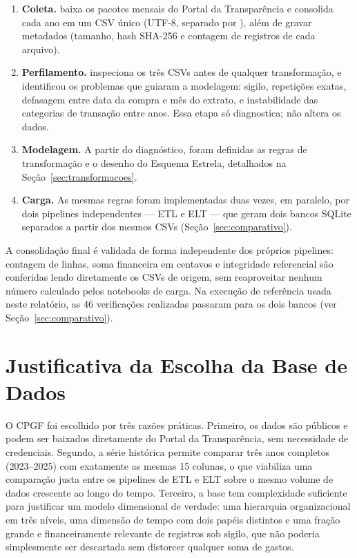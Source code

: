 \documentclass[12pt,a4paper]{article}
\newcommand{\code}[1]{\texttt{\detokenize{#1}}}
\begin{document}
\begin{enumerate}
    \item \textbf{Coleta.} \code{scripts/extract_cpgf.py} baixa os pacotes
    mensais do Portal da Transparência e consolida cada ano em um CSV único
    (UTF-8, separado por \code{;}), além de gravar metadados (tamanho, hash
    SHA-256 e contagem de registros de cada arquivo).
    \item \textbf{Perfilamento.} \code{scripts/profile_cpgf.py} inspeciona
    os três CSVs antes de qualquer transformação, e identificou os
    problemas que guiaram a modelagem: sigilo, repetições exatas,
    defasagem entre data da compra e mês do extrato, e instabilidade das
    categorias de transação entre anos. Essa etapa só diagnostica; não
    altera os dados.
    \item \textbf{Modelagem.} A partir do diagnóstico, foram definidas as
    regras de transformação e o desenho do Esquema Estrela, detalhados na
    Seção~\ref{sec:transformacoes}.
    \item \textbf{Carga.} As mesmas regras foram implementadas duas vezes,
    em paralelo, por dois pipelines independentes --- ETL e ELT --- que
    geram dois bancos SQLite separados a partir dos mesmos CSVs
    (Seção~\ref{sec:comparativo}).
\end{enumerate}

A consolidação final é validada de forma independente dos próprios
pipelines: contagem de linhas, soma financeira em centavos e integridade
referencial são conferidas lendo diretamente os CSVs de origem, sem
reaproveitar nenhum número calculado pelos notebooks de carga. Na execução
de referência usada neste relatório, as 46 verificações realizadas
passaram para os dois bancos (ver Seção~\ref{sec:comparativo}).

\section{Justificativa da Escolha da Base de Dados}

O CPGF foi escolhido por três razões práticas. Primeiro, os dados são
públicos e podem ser baixados diretamente do Portal da Transparência, sem
necessidade de credenciais. Segundo, a série histórica permite comparar
três anos completos (2023--2025) com exatamente as mesmas 15 colunas, o que
viabiliza uma comparação justa entre os pipelines de ETL e ELT sobre o
mesmo volume de dados crescente ao longo do tempo. Terceiro, a base tem
complexidade suficiente para justificar um modelo dimensional de verdade:
uma hierarquia organizacional em três níveis, uma dimensão de tempo com
dois papéis distintos e uma fração grande e financeiramente relevante de
registros sob sigilo, que não poderia simplesmente ser descartada sem
distorcer qualquer soma de gastos.
\end{document}
